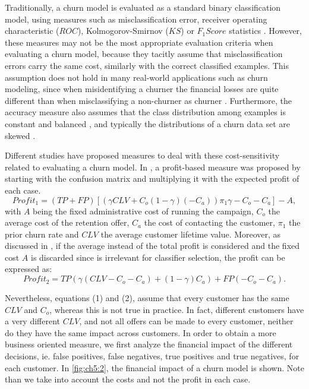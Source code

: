 	Traditionally, a churn model is evaluated as a standard binary classification model, 
using measures such as misclassification error, receiver operating characteristic ($ROC$),  
Kolmogorov-Smirnov ($KS$) or \mbox{$F_1Score$} statistics \citep{Verbeke2012}.
	However, these measures may not be the most appropriate evaluation criteria when  
evaluating a churn model, because they tacitly assume that misclassification errors carry the 
same cost, similarly with the correct classified examples. This assumption does not hold in many 
real-world applications such as churn modeling, since  when misidentifying a churner the financial 
losses are quite different than when misclassifying a non-churner as churner \citep{Glady2009}. 
Furthermore, the accuracy measure also assumes that the class distribution 
among examples is constant and balanced \citep{Provost1998}, and typically the distributions of a 
churn data set are skewed \citep{Verbeke2012}.

Different studies have proposed measures to deal with these cost-sensitivity related to
evaluating a churn model. In \citep{Neslin2006}, a profit-based measure was proposed by starting 
with the confusion matrix and multiplying it with the expected profit of each case.
\begin{equation}
 Profit_1 = (TP+FP)\left[\left(\gamma CLV + C_o(1-\gamma)(-C_a)\right)\pi_1\gamma -C_o-C_a\right]-A,
\end{equation}
with $A$ being the fixed administrative cost of running the campaign, $C_o$ the average cost of the 
retention offer, $C_a$ the cost of contacting the customer, $\pi_1$ the prior churn rate and $CLV$ 
the average customer lifetime value.
Moreover, as discussed in \citep{Verbraken2013}, if the average instead of the total profit is 
considered and the fixed cost $A$ is discarded since is irrelevant for classifier selection, the 
profit can be expressed as:
\begin{equation}
 Profit_2 = 
TP\left(\gamma(CLV-C_o-C_a)+(1-\gamma)C_a \right)+FP(-C_o-C_a).
\end{equation}

Nevertheless, equations (1) and (2), assume that every customer has the same $CLV$ and $C_o$, 
whereas this is not true in practice. In fact, different customers have a very different $CLV$, and 
not all offers can be made to every customer, neither do they have the same impact across customers.
In order to obtain a more business oriented measure, we first analyze the 
financial impact of the different decisions, ie. false positives, false negatives, true positives 
and true negatives, for each customer.	In \figurename{ \ref{fig:ch5:2}}, the financial impact of a 
churn model is shown. Note than we take into account the costs and not the profit in each case.


